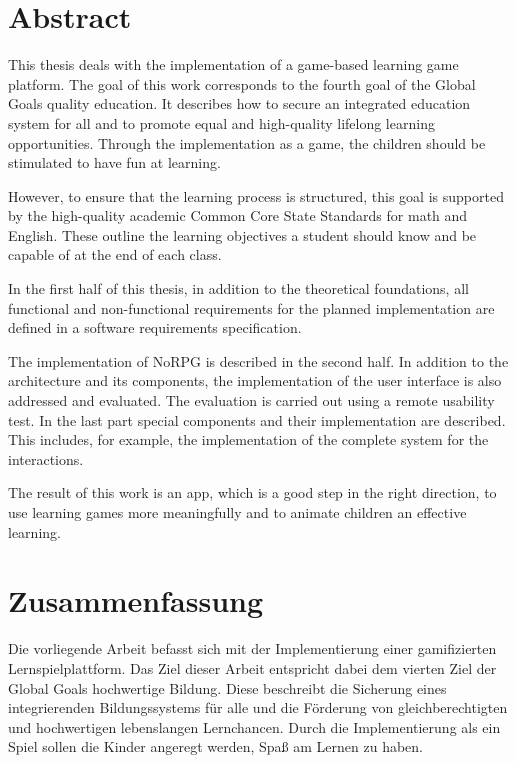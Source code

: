 
\chapter*{Abstract}
	This thesis deals with the implementation of a game-based learning game platform. The goal of this work corresponds to the fourth goal of the Global Goals quality education. It describes how to secure an integrated education system for all and to promote equal and high-quality lifelong learning opportunities. Through the implementation as a game, the children should be stimulated to have fun at learning.
	
	However, to ensure that the learning process is structured, this goal is supported by the high-quality academic Common Core State Standards for math and English. These outline the learning objectives a student should know and be capable of at the end of each class.
	
	In the first half of this thesis, in addition to the theoretical foundations, all functional and non-functional requirements for the planned implementation are defined in a software requirements specification.
	
	The implementation of NoRPG is described in the second half. In addition to the architecture and its components, the implementation of the user interface is also addressed and evaluated. The evaluation is carried out using a remote usability test. In the last part special components and their implementation are described. This includes, for example, the implementation of the complete system for the interactions.
	
	The result of this work is an app, which is a good step in the right direction, to use learning games more meaningfully and to animate children an effective learning.
		
\pagebreak

\chapter*{Zusammenfassung}
	Die vorliegende Arbeit befasst sich mit der Implementierung einer gamifizierten Lernspielplattform. Das Ziel dieser Arbeit entspricht dabei dem vierten Ziel der Global Goals hochwertige Bildung. Diese beschreibt die Sicherung eines integrierenden Bildungssystems für alle und die Förderung von gleichberechtigten und hochwertigen lebenslangen Lernchancen. Durch die Implementierung als ein Spiel sollen die Kinder angeregt werden, Spaß am Lernen zu haben.
	
